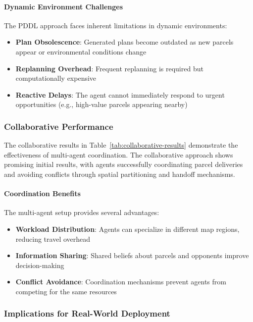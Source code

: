 \paragraph{Dynamic Environment Challenges}
The PDDL approach faces inherent limitations in dynamic environments:
\begin{itemize}
    \item \textbf{Plan Obsolescence}: Generated plans become outdated as new parcels appear or environmental conditions change
    \item \textbf{Replanning Overhead}: Frequent replanning is required but computationally expensive
    \item \textbf{Reactive Delays}: The agent cannot immediately respond to urgent opportunities (e.g., high-value parcels appearing nearby)
\end{itemize}

\subsubsection{Collaborative Performance}

The collaborative results in Table~\ref{tab:collaborative-results} demonstrate the effectiveness of multi-agent coordination. The collaborative approach shows promising initial results, with agents successfully coordinating parcel deliveries and avoiding conflicts through spatial partitioning and handoff mechanisms.

\paragraph{Coordination Benefits}
The multi-agent setup provides several advantages:
\begin{itemize}
    \item \textbf{Workload Distribution}: Agents can specialize in different map regions, reducing travel overhead
    \item \textbf{Information Sharing}: Shared beliefs about parcels and opponents improve decision-making
    \item \textbf{Conflict Avoidance}: Coordination mechanisms prevent agents from competing for the same resources
\end{itemize}

\subsubsection{Implications for Real-World Deployment}

